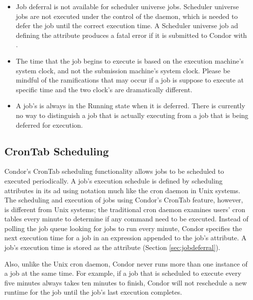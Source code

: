 \begin{itemize}
\item Job deferral is not available for scheduler universe jobs.
Scheduler universe jobs are not executed under the control 
of the  daemon, 
which is needed to defer the job until the correct execution time. 
A Scheduler universe job ad defining the  attribute 
produces a fatal error if it is submitted to Condor with .

\item The time that the job begins to execute 
is based on the execution machine's system clock, 
and not the submission machine's system clock. 
Please be mindful of the ramifications that may occur 
if a job is suppose to execute at specific time 
and the two clock's are dramatically different.

\item A job's  is always in the Running state 
when it is deferred. 
There is currently no way to distinguish a job that is 
actually executing from a job that is being deferred for execution. 
\end{itemize}

\subsection{CronTab Scheduling}
\label{sec:crontab}

Condor's CronTab scheduling functionality allows jobs to be 
scheduled to executed periodically. 
A job's execution schedule is defined by scheduling attributes 
in its ad using notation much like the cron daemon in Unix systems. 
The scheduling and execution of jobs using Condor's CronTab feature, 
however, is different from Unix systems; 
the traditional cron daemon examines users' cron tables 
every minute to determine if any command need to be executed. 
Instead of polling the job queue looking for jobs to run every minute, 
Condor specifies the next execution time for a job in an expression 
appended to the job's  attribute. 
A job's execution time is stored as the  
attribute (Section \ref{sec:jobdeferral}).

Also, unlike the Unix cron daemon, 
Condor never runs more than one instance of a job at the same time. 
For example, if a job that is scheduled to execute every five minutes 
always takes ten minutes to finish, 
Condor will not reschedule a new runtime for the job 
until the job's last execution completes.

